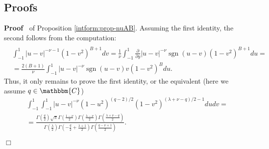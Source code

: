 \documentclass{article}
\newcommand{\tmop}[1]{\ensuremath{\operatorname{#1}}}
\renewenvironment{proof}{\noindent\textbf{Proof\ }}{\hspace*{\fill}$\Box$\medskip}
\theoremstyle{remark}
\begin{document}
\subsection{Proofs}

\begin{proof}
  of Proposition \ref{intform:prop-nuAB}. Assuming the first identity, the
  second follows from the computation:
  \begin{eqnarray}
    &  &  \nonumber\\
    & \int_{- 1}^1 | u - v |^{- \nu - 1} (1 - v^2)^{B + 1} d v =
    \frac{1}{\nu} \int_{- 1}^1 \frac{\partial}{\partial y} | u - v |^{- \nu}
    \tmop{sgn} (u - v) (1 - v^2)^{B + 1} d u = &  \nonumber\\
    & = \frac{2 (B + 1)}{\nu} \int_{- 1}^1 | u - v |^{- \nu} \tmop{sgn} (u -
    v) v (1 - v^2)^B d u. &  \nonumber
  \end{eqnarray}
  Thus, it only remains to prove the first identity, or the equivalent (here
  we assume $q \in \mathbbm{C}$)
  \begin{eqnarray}
    & \int_{- 1}^1 \int_{- 1}^1 | u - v |^{- \nu} (1 - u^2)^{(q - 2) / 2} (1
    - v^2)^{(\lambda + \nu - q) / 2 - 1} d u d v = &  \nonumber\\
    & = \frac{\Gamma \left( \frac{q}{2} \right) \sqrt{\pi} \Gamma \left(
    \frac{1 - \nu}{2} \right) \Gamma \left( \frac{\lambda - \nu}{2} \right)
    \Gamma \left( \frac{\lambda + \nu - q}{2} \right)}{\Gamma \left(
    \frac{\lambda}{2} \right) \Gamma \left( - \frac{q}{2} + \frac{\lambda +
    1}{2} \right) \Gamma \left( \frac{q - \nu + 1}{2} \right)} . &  \nonumber
  \end{eqnarray}
  

\end{proof}
\end{document}
